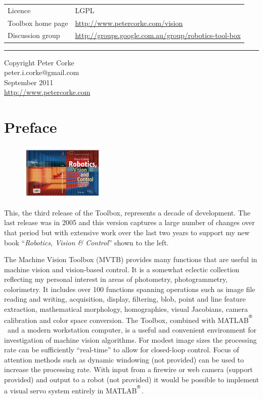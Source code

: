 \documentclass[a4paper]{report}
\def\Mlab{MATLAB$^{\textsuperscript{\textregistered}}$}
\begin{document}

\thispagestyle{empty}
\newpage
\vspace*{\fill}
\begin{tabular}{ll}
Licence & LGPL \\
Toolbox home page &  \url{http://www.petercorke.com/vision} \\
Discussion group & \url{http://groups.google.com.au/group/robotics-tool-box}
\end{tabular}
\vspace*{\fill}
\hrule
Copyright  Peter Corke\\
peter.i.corke$@$gmail.com\\
September 2011\\    %
\url{http://www.petercorke.com}



\pagestyle{headings}        %
\lfoot{Machine Vision Toolbox for \Mlab}

\newpage
\setcounter{section}{0}

\chapter*{Preface}
\pagestyle{fancyplain}
\begin{figure}
\vspace{-2ex}\includegraphics[width=4cm]{frontcover.pdf}
\end{figure}
This, the third release of the Toolbox, represents a decade of %
development.
The last release was in 2005 and this version captures a large number of changes over that period but with extensive work
over  the last two years
to support my new book ``\textit{Robotics, Vision \& Control}'' shown to the left.

The Machine Vision Toolbox (MVTB) provides many 
functions that 
are useful in machine vision and vision-based control.
It is a somewhat eclectic collection reflecting my personal interest in
areas of photometry, photogrammetry, colorimetry.
It includes over 100 functions spanning operations such as
image file reading and writing, acquisition, display, filtering,
blob, point and line feature extraction,  mathematical morphology, 
homographies, visual Jacobians,
camera calibration and color space conversion.
The Toolbox, combined with \Mlab\ and a modern workstation computer,
is a useful and convenient environment for investigation of machine
vision algorithms.  For modest image sizes the processing rate can
be sufficiently ``real-time'' to allow for closed-loop control.  Focus of
attention methods such as dynamic windowing (not provided) can be
used to increase the processing rate.
With input from a firewire or web camera (support provided) and 
output to a robot
(not provided) it would be possible to implement a visual servo system
entirely in \Mlab.
\end{document}
